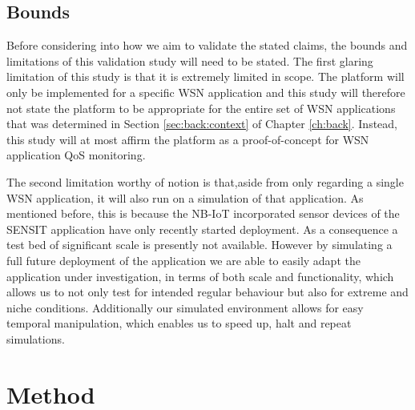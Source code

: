 \subsection{Bounds}
Before considering into how we aim to validate the stated claims, the bounds and limitations of this validation study will need to be stated. The first glaring limitation of this study is that  it is extremely limited in scope. The platform will only be implemented for a specific WSN application and this study will therefore not state the platform to be appropriate for the entire set of WSN applications that was determined in Section \ref{sec:back:context} of Chapter \ref{ch:back}. Instead, this study will at most affirm the platform as a proof-of-concept for WSN application QoS monitoring.

The second limitation worthy of notion is that,aside from only regarding a single WSN application, it will also run on a simulation of that application. As mentioned before, this is because the NB-IoT incorporated sensor devices of the SENSIT application have only recently started deployment. As a consequence a test bed of significant scale is presently not available. However by simulating a full future deployment of the application we are able to easily adapt the application under investigation, in terms of both scale and functionality, which allows us to not only test for intended regular behaviour but also for extreme and niche conditions. Additionally our simulated environment allows for easy temporal manipulation, which enables us to speed up, halt and repeat simulations.

\section{Method}
\label{sec:val:method}
